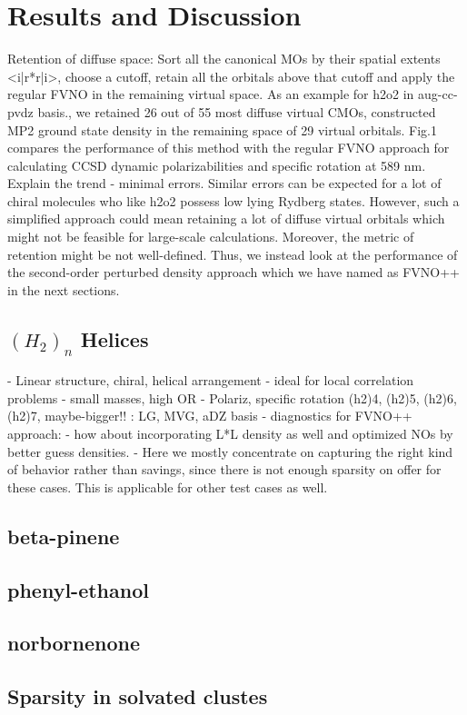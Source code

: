 \section{Results and Discussion}
Retention of diffuse space: Sort all the canonical MOs by their spatial
extents <i|r*r|i>, choose a cutoff, retain all the orbitals above that cutoff
and apply the regular FVNO in the remaining virtual space. As an example
for h2o2 in aug-cc-pvdz basis., we retained 26 out of 55 most diffuse virtual 
CMOs, constructed MP2 ground state density in the remaining space of 
29 virtual orbitals. Fig.1 compares the performance of this method 
with the regular FVNO approach for calculating CCSD dynamic polarizabilities
and specific rotation at 589 nm. Explain the trend - minimal errors. Similar
errors can be expected for a lot of chiral molecules who like h2o2 possess 
low lying Rydberg states. However, such a simplified approach could mean 
retaining a lot of diffuse virtual orbitals which might not be feasible 
for large-scale calculations. Moreover, the metric of retention might
be not well-defined. Thus, we instead look at the performance
of the second-order perturbed density approach which we have named as FVNO++ 
in the next sections.
\subsection{$(H_2)_n$ Helices}
- Linear structure, chiral, helical arrangement
- ideal for local correlation problems
- small masses, high OR
- Polariz, specific rotation (h2)4, (h2)5, (h2)6, (h2)7, maybe-bigger!! : LG, MVG, aDZ basis
- diagnostics for FVNO++ approach:
	- how about incorporating L*L density as well and optimized NOs by better guess densities.
	- Here we mostly concentrate on capturing the right kind of behavior rather 
  	than savings, since there is not enough sparsity on offer for these cases.
  	This is applicable for other test cases as well.

\subsection{beta-pinene}
\subsection{phenyl-ethanol}
\subsection{norbornenone}
\subsection{Sparsity in solvated clustes}
